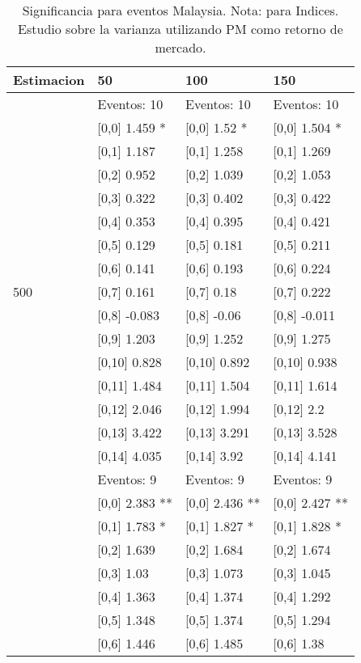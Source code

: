 \begin{table}

\caption{Significancia para eventos Malaysia. Nota: para Indices. Estudio sobre la varianza utilizando PM como retorno de mercado.}
\centering
\begin{tabular}[t]{llll}
\toprule
Estimacion & 50 & 100 & 150\\
\midrule
 & Eventos:  10 & Eventos:  10 & Eventos:  10\\
 & {}[0,0] 1.459 * & {}[0,0] 1.52 * & {}[0,0] 1.504 *\\
 & {}[0,1] 1.187 & {}[0,1] 1.258 & {}[0,1] 1.269\\
 & {}[0,2] 0.952 & {}[0,2] 1.039 & {}[0,2] 1.053\\
 & {}[0,3] 0.322 & {}[0,3] 0.402 & {}[0,3] 0.422\\
\addlinespace
 & {}[0,4] 0.353 & {}[0,4] 0.395 & {}[0,4] 0.421\\
 & {}[0,5] 0.129 & {}[0,5] 0.181 & {}[0,5] 0.211\\
 & {}[0,6] 0.141 & {}[0,6] 0.193 & {}[0,6] 0.224\\
500 & {}[0,7] 0.161 & {}[0,7] 0.18 & {}[0,7] 0.222\\
 & {}[0,8] -0.083 & {}[0,8] -0.06 & {}[0,8] -0.011\\
\addlinespace
 & {}[0,9] 1.203 & {}[0,9] 1.252 & {}[0,9] 1.275\\
 & {}[0,10] 0.828 & {}[0,10] 0.892 & {}[0,10] 0.938\\
 & {}[0,11] 1.484 & {}[0,11] 1.504 & {}[0,11] 1.614\\
 & {}[0,12] 2.046 & {}[0,12] 1.994 & {}[0,12] 2.2\\
 & {}[0,13] 3.422 & {}[0,13] 3.291 & {}[0,13] 3.528\\
\addlinespace
 & {}[0,14] 4.035 & {}[0,14] 3.92 & {}[0,14] 4.141\\
 & Eventos:  9 & Eventos:  9 & Eventos:  9\\
 & {}[0,0] 2.383 ** & {}[0,0] 2.436 ** & {}[0,0] 2.427 **\\
 & {}[0,1] 1.783 * & {}[0,1] 1.827 * & {}[0,1] 1.828 *\\
 & {}[0,2] 1.639 & {}[0,2] 1.684 & {}[0,2] 1.674\\
\addlinespace
 & {}[0,3] 1.03 & {}[0,3] 1.073 & {}[0,3] 1.045\\
 & {}[0,4] 1.363 & {}[0,4] 1.374 & {}[0,4] 1.292\\
 & {}[0,5] 1.348 & {}[0,5] 1.374 & {}[0,5] 1.294\\
 & {}[0,6] 1.446 & {}[0,6] 1.485 & {}[0,6] 1.38\\

\end{tabular}
\end{table}
